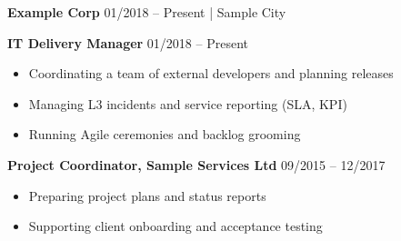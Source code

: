 
\begin{cvparagraph}

\textbf{Example Corp} \hfill 01/2018 -- Present | Sample City

\vspace{2mm}

{\large \textbf{IT Delivery Manager}} \hfill 01/2018 -- Present

\vspace{1mm}

\begin{itemize}
\setlength{\itemsep}{0pt}
\setlength{\parskip}{0pt}
    \item Coordinating a team of external developers and planning releases
    \item Managing L3 incidents and service reporting (SLA, KPI)
    \item Running Agile ceremonies and backlog grooming
\end{itemize}

\vspace{1mm}

{\large \textbf{Project Coordinator, Sample Services Ltd}} \hfill 09/2015 -- 12/2017

\vspace{1mm}

\begin{itemize}
\setlength{\itemsep}{0pt}
\setlength{\parskip}{0pt}
    \item Preparing project plans and status reports
    \item Supporting client onboarding and acceptance testing
\end{itemize}

\end{cvparagraph}
